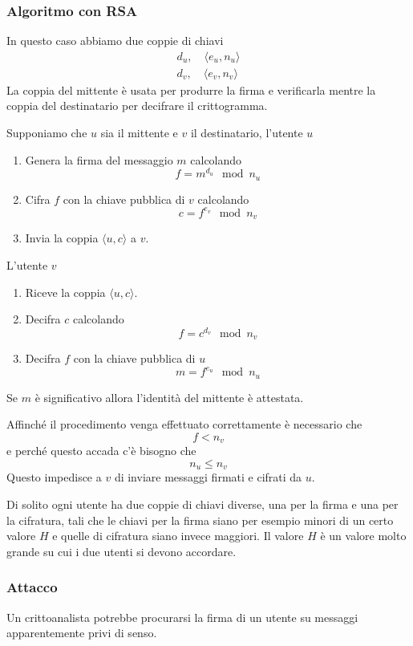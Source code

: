 \subsubsection{Algoritmo con RSA}
In questo caso abbiamo due coppie di chiavi
\begin{gather*}
	d_u, \quad \langle e_u, n_u \rangle \\
	d_v, \quad \langle e_v, n_v \rangle
\end{gather*}
La coppia del mittente \`e usata per produrre la firma e verificarla mentre la coppia del destinatario per decifrare
il crittogramma.

Supponiamo che $u$ sia il mittente e $v$ il destinatario, l'utente $u$
\begin{enumerate}
	\item Genera la firma del messaggio $m$ calcolando
	      \[ f = m^{d_u} \mod{n_u} \]
	\item Cifra $f$ con la chiave pubblica di $v$ calcolando
	      \[ c = f^{e_v} \mod{n_v} \]
	\item Invia la coppia $\langle u, c \rangle$ a $v$.
\end{enumerate}
L'utente $v$
\begin{enumerate}
	\item Riceve la coppia $\langle u, c \rangle$.
	\item Decifra $c$ calcolando
	      \[ f = c^{d_v} \mod{n_v} \]
	\item Decifra $f$ con la chiave pubblica di $u$
	      \[ m = f^{e_u} \mod{n_u} \]
\end{enumerate}
Se $m$ \`e significativo allora l'identit\`a del mittente \`e attestata.

Affinch\'e il procedimento venga effettuato correttamente \`e necessario che
\[ f < n_v \]
e perch\'e questo accada c'\`e bisogno che
\[ n_u \leq n_v \]
Questo impedisce a $v$ di inviare messaggi firmati e cifrati da $u$.

Di solito ogni utente ha due coppie di chiavi diverse, una per la firma e una per la cifratura, tali che le chiavi
per la firma siano per esempio minori di un certo valore $H$ e quelle di cifratura siano invece maggiori. Il valore
$H$ \`e un valore molto grande su cui i due utenti si devono accordare.

\subsubsection{Attacco}
Un crittoanalista potrebbe procurarsi la firma di un utente su messaggi apparentemente privi di senso.

